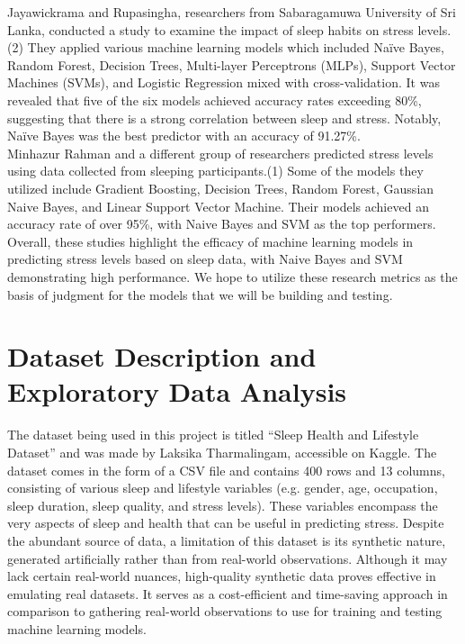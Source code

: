 \documentclass[11pt, letterpaper]{article}
\begin{document}
    \noindent Jayawickrama and Rupasingha, researchers from Sabaragamuwa University of Sri Lanka, conducted a study to examine the impact of sleep habits on stress levels.(2) They applied various machine learning models which included Naïve Bayes, Random Forest, Decision Trees, Multi-layer Perceptrons (MLPs), Support Vector Machines (SVMs), and Logistic Regression mixed with cross-validation. It was revealed that five of the six models achieved accuracy rates exceeding 80\%, suggesting that there is a strong correlation between sleep and stress. Notably, Naïve Bayes was the best predictor with an accuracy of 91.27\%.\\ 
    
    \noindent Minhazur Rahman and a different group of researchers predicted stress levels using data collected from sleeping participants.(1) Some of the models they utilized include Gradient Boosting, Decision Trees, Random Forest, Gaussian Naive Bayes, and Linear Support Vector Machine. Their models achieved an accuracy rate of over 95\%, with Naive Bayes and SVM as the top performers.\\
    
    \noindent Overall, these studies highlight the efficacy of machine learning models in predicting stress levels based on sleep data, with Naive Bayes and SVM demonstrating high performance. We hope to utilize these research metrics as the basis of judgment for the models that we will be building and testing.


    \section*{Dataset Description and Exploratory Data Analysis}
    \noindent The dataset being used in this project is titled “Sleep Health and Lifestyle Dataset” and was made by Laksika Tharmalingam, accessible on Kaggle. The dataset comes in the form of a CSV file and contains 400 rows and 13 columns, consisting of various sleep and lifestyle variables (e.g. gender, age, occupation, sleep duration, sleep quality, and stress levels). These variables encompass the very aspects of sleep and health that can be useful in predicting stress. Despite the abundant source of data, a limitation of this dataset is its synthetic nature, generated artificially rather than from real-world observations. Although it may lack certain real-world nuances, high-quality synthetic data proves effective in emulating real datasets. It serves as a cost-efficient and time-saving approach in comparison to gathering real-world observations to use for training and testing machine learning models.\\
    
\end{document}
